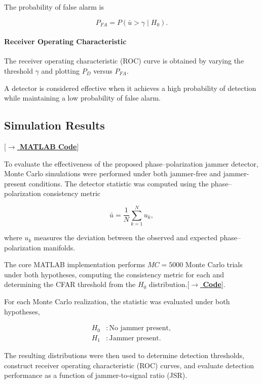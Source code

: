 \documentclass{article}
\begin{document}
The probability of false alarm is

\begin{equation}
P_{FA}=
P(\bar{u}>\gamma \mid H_0).
\end{equation}

\paragraph{Receiver Operating Characteristic}

The receiver operating characteristic (ROC) curve is obtained by varying the threshold $\gamma$ and plotting $P_D$ versus $P_{FA}$.

A detector is considered effective when it achieves a high probability of detection while maintaining a low probability of false alarm.

\subsection{Simulation Results} [\hyperref[lst:polmc]{\textbf{$\rightarrow$ MATLAB Code}}]

To evaluate the effectiveness of the proposed phase--polarization jammer
detector, Monte Carlo simulations were performed under both jammer-free and
jammer-present conditions. The detector statistic was computed using the
phase--polarization consistency metric

\begin{equation}
\bar{u}
=
\frac{1}{N}
\sum_{k=1}^{N}
u_k,
\end{equation}

where $u_k$ measures the deviation between the observed and expected
phase--polarization manifolds.

The core MATLAB implementation performs $MC = 5000$ Monte Carlo trials under both hypotheses, computing the consistency metric for each and determining the CFAR threshold from the $H_0$ distribution.[\hyperref[lst:polmc]{\textbf{$\rightarrow$ Code}}].

For each Monte Carlo realization, the statistic was evaluated under both
hypotheses,

\begin{align}
H_0 &: \text{No jammer present},\\
H_1 &: \text{Jammer present}.
\end{align}

The resulting distributions were then used to determine detection thresholds,
construct receiver operating characteristic (ROC) curves, and evaluate
detection performance as a function of jammer-to-signal ratio (JSR).
\end{document}
